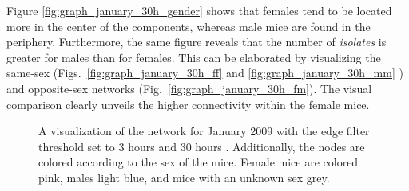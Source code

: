 Figure \ref{fig:graph_january_30h_gender} shows that females tend to be located more in the center of the components, whereas male mice are found in the periphery. Furthermore, the same figure reveals that the number of \textit{isolates} is greater for males than for females. This can be elaborated by visualizing the same-sex (Figs.~\ref{fig:graph_january_30h_ff} and \ref{fig:graph_january_30h_mm} ) and opposite-sex networks (Fig.~\ref{fig:graph_january_30h_fm}). The visual comparison clearly unveils the higher connectivity within the female mice.

\begin{figure}[htpb]%
	\centering 
	\qquad 
			
	\caption[Network visualizations with different edge filter values]{A visualization of the network for January 2009 with the edge filter threshold set to 3 hours  and 30 hours . Additionally, the nodes are colored according to the sex of the mice. Female mice are colored pink, males light blue, and mice with an unknown sex grey.}  
\end{figure}

